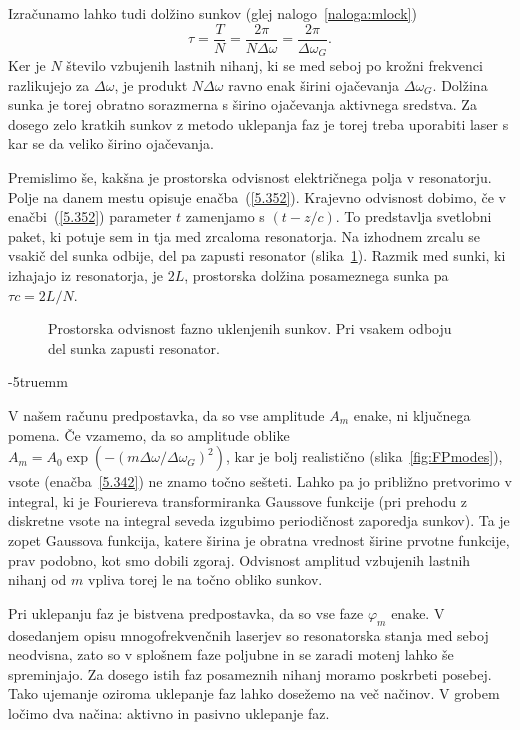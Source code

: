 Izračunamo lahko tudi dolžino sunkov (glej nalogo~\ref{naloga:mlock})
\begin{equation}
\tau=\frac{T}{N}=\frac{2\pi }{N\Delta \omega }=\frac{2\pi }{\Delta\omega_{G}}.
\label{5.37}
\end{equation}
Ker je $N$ število vzbujenih lastnih nihanj, ki se med seboj po krožni 
frekvenci razlikujejo za $\Delta \omega$, je produkt $N\Delta \omega$ ravno enak
širini ojačevanja $\Delta \omega_{G}$. Dolžina sunka je torej obratno sorazmerna s širino
ojačevanja aktivnega sredstva. Za dosego zelo kratkih sunkov z metodo uklepanja
faz je torej treba uporabiti laser s kar se da veliko širino ojačevanja. 

Premislimo še, kakšna je prostorska odvisnost električnega polja v
resonatorju. Polje na danem mestu opisuje enačba~(\ref{5.352}). Krajevno 
odvisnost dobimo, če v enačbi~(\ref{5.352}) parameter $t$ zamenjamo s $(t-z/c)$. To
predstavlja svetlobni paket, ki potuje sem in tja med zrcaloma
resonatorja. Na izhodnem zrcalu se vsakič del sunka odbije, del pa zapusti
resonator (slika~\ref{fig.5.11}). Razmik med sunki, ki izhajajo iz
resonatorja, je $2L$, prostorska dolžina posameznega sunka pa $\tau c=2L/N$.
\begin{figure}[h]
\centering
\def\svgwidth{90truemm} 

\caption{Prostorska odvisnost fazno uklenjenih sunkov. Pri vsakem odboju del
sunka zapusti resonator.}
\label{fig.5.11}
\end{figure}
\vglue-5truemm
\begin{remark}
V našem računu predpostavka, da so vse amplitude $A_{m}$ enake, ni ključnega 
pomena. Če vzamemo, da so amplitude oblike 
$A_{m}=A_{0}\exp (-(m\Delta \omega /\Delta \omega_{G})^{2})$, 
kar je bolj realistično (slika~\ref{fig:FPmodes}), vsote (enačba~\ref{5.342}) 
ne znamo točno sešteti. Lahko pa jo
približno pretvorimo v integral, ki je Fouriereva transformiranka Gaussove
funkcije (pri prehodu z diskretne vsote na integral seveda izgubimo
periodičnost zaporedja sunkov). Ta je zopet Gaussova funkcija, katere
širina je obratna vrednost širine prvotne funkcije, prav podobno, kot
smo dobili zgoraj. Odvisnost amplitud vzbujenih lastnih nihanj od $m$ 
vpliva torej le na točno obliko sunkov.
\end{remark}

Pri uklepanju faz je bistvena predpostavka, da so vse faze $\varphi_m$ enake. 
V dosedanjem opisu mnogofrekvenčnih laserjev so resonatorska stanja med seboj
neodvisna, zato so v splošnem faze poljubne in se zaradi motenj lahko še spreminjajo.
Za dosego istih faz posameznih nihanj moramo poskrbeti posebej. Tako ujemanje
oziroma uklepanje faz lahko dosežemo na več načinov. V grobem ločimo dva načina:
aktivno in pasivno uklepanje faz.

